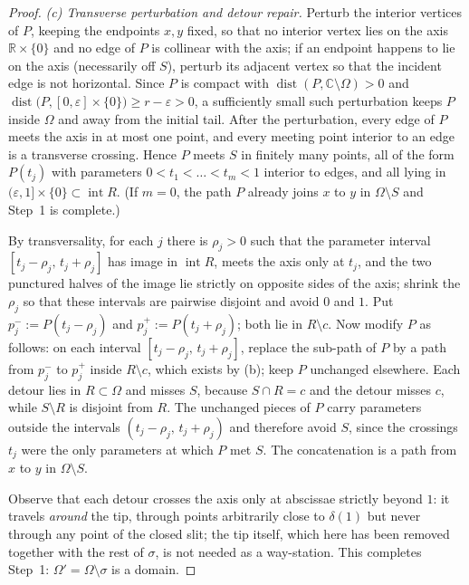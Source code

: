 \documentclass[11pt,reqno]{amsart}
\theoremstyle{definition}
\theoremstyle{remark}
\newcommand{\C}{\mathbb C}
\newcommand{\Int}{\operatorname{int}}
\newcommand{\dist}{\operatorname{dist}}
\begin{document}
\begin{proof}
\emph{(c) Transverse perturbation and detour repair.}
Perturb the interior vertices of $P$, keeping the endpoints $x,y$ fixed, so that no
interior vertex lies on the axis $\mathbb{R}\times\{0\}$ and no edge of $P$ is collinear
with the axis; if an endpoint happens to lie on the axis (necessarily off $S$), perturb
its adjacent vertex so that the incident edge is not horizontal. Since $P$ is compact
with $\dist(P,\C\setminus\Omega)>0$ and $\dist\bigl(P,[0,\varepsilon]\times\{0\}\bigr)
\ge r-\varepsilon>0$, a sufficiently small such perturbation keeps $P$ inside $\Omega$
and away from the initial tail. After the perturbation, every edge of $P$ meets the axis
in at most one point, and every meeting point interior to an edge is a transverse
crossing. Hence $P$ meets $S$ in finitely many points, all of the form $P(t_j)$ with
parameters $0<t_1<\dots<t_m<1$ interior to edges, and all lying in
$( \varepsilon,1]\times\{0\}\subset\Int R$. (If $m=0$, the path $P$ already joins $x$ to
$y$ in $\Omega\setminus S$ and Step~1 is complete.)

By transversality, for each $j$ there is $\rho_j>0$ such that the parameter interval
$[t_j-\rho_j,\,t_j+\rho_j]$ has image in $\Int R$, meets the axis only at $t_j$, and the
two punctured halves of the image lie strictly on opposite sides of the axis; shrink the
$\rho_j$ so that these intervals are pairwise disjoint and avoid $0$ and $1$. Put
$p_j^{-}:=P(t_j-\rho_j)$ and $p_j^{+}:=P(t_j+\rho_j)$; both lie in $R\setminus c$.
Now modify $P$ as follows: on each interval $[t_j-\rho_j,\,t_j+\rho_j]$, replace the
sub-path of $P$ by a path from $p_j^{-}$ to $p_j^{+}$ inside $R\setminus c$, which
exists by (b); keep $P$ unchanged elsewhere. Each detour lies in $R\subset\Omega$ and
misses $S$, because $S\cap R=c$ and the detour misses $c$, while $S\setminus R$ is
disjoint from $R$. The unchanged pieces of $P$ carry parameters outside the intervals
$(t_j-\rho_j,\,t_j+\rho_j)$ and therefore avoid $S$, since the crossings $t_j$ were the
only parameters at which $P$ met $S$. The concatenation is a path from $x$ to $y$ in
$\Omega\setminus S$.

Observe that each detour crosses the axis only at abscissae strictly beyond $1$: it
travels \emph{around} the tip, through points arbitrarily close to $\delta(1)$ but never
through any point of the closed slit; the tip itself, which here has been removed
together with the rest of $\sigma$, is not needed as a way-station. This completes
Step~1: $\Omega'=\Omega\setminus\sigma$ is a domain.


\end{proof}
\end{document}

